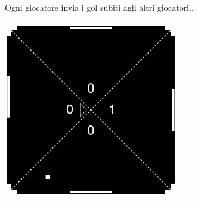\documentclass[11pt, a4paper, titlepage, block]{article}
\begin{document}
\\
\\
Ogni giocatore invia i gol subiti agli altri giocatori..\\\\
\includegraphics[width=3in,height=3in,viewport=0 0 300 300]{./Screenshots/Capture4.jpg}
	\\	
	\\
\end{document}
